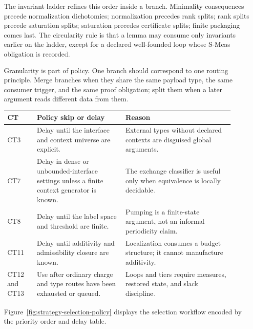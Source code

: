 \documentclass[
  11pt,
]{article}
\theoremstyle{definition}
\begin{document}
The invariant ladder refines this order inside a branch. Minimality
consequences precede normalization dichotomies; normalization precedes
rank splits; rank splits precede saturation splits; saturation precedes
certificate splits; finite packaging comes last. The circularity rule is
that a lemma may consume only invariants earlier on the ladder, except
for a declared well-founded loop whose S-Meas obligation is recorded.

Granularity is part of policy. One branch should correspond to one
routing principle. Merge branches when they share the same payload type,
the same consumer trigger, and the same proof obligation; split them
when a later argument reads different data from them.

\begingroup
\small
\setlength{\tabcolsep}{2pt}
\begin{longtable}[]{@{}
  >{\raggedright\arraybackslash}p{0.12\linewidth}
  >{\raggedright\arraybackslash}p{0.36\linewidth}
  >{\raggedright\arraybackslash}p{0.44\linewidth}@{}}
\toprule\noalign{}
CT & Policy skip or delay & Reason \\
\midrule\noalign{}
\endhead
\bottomrule\noalign{}
\endlastfoot
CT3 & Delay until the interface and context universe are explicit. & External types without declared contexts are disguised global arguments. \\
CT7 & Delay in dense or unbounded-interface settings unless a finite context generator is known. & The exchange classifier is useful only when equivalence is locally decidable. \\
CT8 & Delay until the label space and threshold are finite. & Pumping is a finite-state argument, not an informal periodicity claim. \\
CT11 & Delay until additivity and admissibility closure are known. & Localization consumes a budget structure; it cannot manufacture additivity. \\
CT12 and CT13 & Use after ordinary charge and type routes have been exhausted or queued. & Loops and tiers require measures, restored state, and slack discipline. \\
\end{longtable}
\endgroup

Figure~\ref{fig:strategy-selection-policy} displays the selection
workflow encoded by the priority order and delay table.
\end{document}
